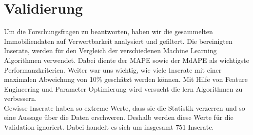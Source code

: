 \section{Validierung}
Um die Forschungsfragen zu beantworten, haben wir die gesammelten Immobiliendaten auf Verwertbarkeit analysiert und gefiltert. Die bereinigten Inserate, werden für den Vergleich der verschiedenen Machine Learning Algorithmen verwendet. Dabei diente der MAPE sowie der MdAPE als wichtigste Performanzkriterien. Weiter war uns wichtig, wie viele Inserate mit einer maximalen Abweichung von 10\% geschätzt werden können. Mit Hilfe von Feature Engineering und Parameter Optimierung wird versucht die lern Algorithmen zu verbessern.\\
Gewisse Inserate haben so extreme Werte, dass sie die Statistik verzerren und so eine Aussage über die Daten erschweren. Deshalb werden diese Werte für die Validation ignoriert. Dabei handelt es sich um insgesamt 751 Inserate.\\
%
